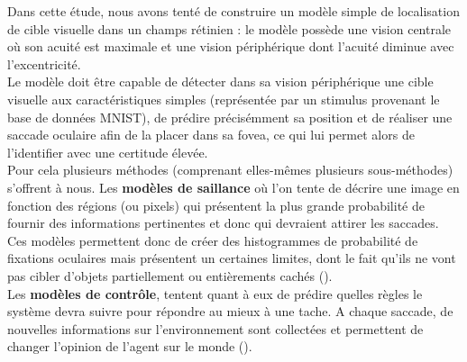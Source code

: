 Dans cette étude, nous avons tenté de construire un modèle simple de localisation de cible visuelle dans un champs rétinien : le modèle possède une vision centrale où son acuité est maximale et une vision périphérique dont l'acuité diminue avec l'excentricité.\\
Le modèle doit être capable de détecter dans sa vision périphérique une cible visuelle aux caractéristiques simples (représentée par un stimulus provenant le base de données MNIST), de prédire précisémment sa position et de réaliser une saccade oculaire afin de la placer dans sa fovea, ce qui lui permet alors de l'identifier avec une certitude élevée.\\
Pour cela plusieurs méthodes (comprenant elles-mêmes plusieurs sous-méthodes) s'offrent à nous. Les \textbf{modèles de saillance} où l'on tente de décrire une image en fonction des régions (ou pixels) qui présentent la plus grande probabilité de fournir des informations pertinentes et donc qui devraient attirer les saccades. Ces modèles permettent donc de créer des histogrammes de probabilité de fixations oculaires mais présentent un certaines limites, dont le fait qu'ils ne vont pas cibler d'objets partiellement ou entièrements cachés (\cite{Butko2010}).\\
Les \textbf{modèles de contrôle}, tentent quant à eux de prédire quelles règles le système devra suivre pour répondre au mieux à une tache. A chaque saccade, de nouvelles informations sur l'environnement sont collectées et permettent de changer l'opinion de l'agent sur le monde (\cite{Butko2010}).
